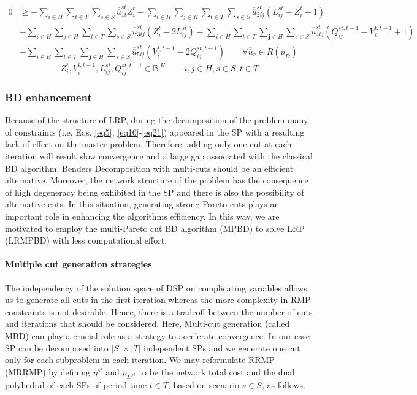 \documentclass[review]{elsarticle}
\begin{document}
\begin{align}
0&\geq -\sum_{i\in H}\sum_{t\in T}\sum_{s\in S}\overline{\overline{u}}^{st}_{1i}Z^t_i-\sum_{i\in H}{\sum_{j\in H}{\sum_{t\in T}{\sum_{s\in S}{{\overline{\overline{u}}}^{st}_{2ij}\left(L^{st}_{ij}-Z^t_i+1\right)}}}}\nonumber\\
&-\sum_{i\in H}\sum_{j\in H}\sum_{t\in T}\sum_{s\in S}{\overline{\overline{u}}}^{st}_{3ij}\left(Z^t_i-2L^{st}_{ij}\right)
-\sum_{i\in H}{\sum_{t\in T}{\sum_{\mathbf{ j}\in H}{\sum_{s\in S}{{\overline{\overline{u}}}^{st}_{4ij}\left(Q^{st,t-1}_{ij}-V^{t,t-1}_i+1\right)}}}}\nonumber\\
&-\sum_{i\in H}{\sum_{t\in T}{\sum_{\mathbf{ j}\in H}{\sum_{s\in S}{{\overline{\overline{u}}}^{st}_{5ij}\left(V^{t,t-1}_i-2Q^{st,t-1}_{ij}\right)}}}}\qquad\forall {\overline{\overline{u}}}_r\in R(p_D)
\end{align} 
\[Z^t_i,V^{t,t-1}_i,L^{st}_{ij},Q^{st,t-1}_{ij}\in {\mathbb{ B}}^{\left|H\right|}\qquad i,j\in H, s\in S, t\in T\]

\subsubsection{BD enhancement}

Because of the structure of LRP, during the decomposition of the problem many of constraints (i.e. Eqs, \eqref{eq5}, \eqref{eq16}-\eqref{eq21}) appeared in the SP with a resulting lack of effect on the master problem. Therefore, adding only one cut at each iteration will result slow convergence and a large gap associated with the classical BD algorithm. Benders Decomposition with multi-cuts should be an efficient alternative. Moreover, the network structure of the problem has the consequence of high degeneracy being exhibited in the SP and there is also the possibility of alternative cuts. In this situation, generating strong Pareto cuts plays an important role in enhancing the algorithms efficiency. In this way, we are motivated to employ the multi-Pareto cut BD algorithm (MPBD) to solve LRP (LRMPBD) with less computational effort.

\paragraph{Multiple cut generation strategies}

The independency of the solution space of DSP on complicating variables allows us to generate all cuts in the first iteration whereas the more complexity in RMP constraints is not desirable. Hence, there is a tradeoff between the number of cuts and iterations that should be considered. Here, Multi-cut generation (called MBD) can play a crucial role as a strategy to accelerate convergence. In our case SP can be decomposed into $|S|\times |T|$ independent SPs  and we generate one cut only for each subproblem in each iteration. We may reformulate RRMP (MRRMP) by defining $\eta^{st}$ and $p_{D^{st}}$ to be the network total cost and the dual polyhedral of each SPs of period time $t\in T$, based on scenario $s\in S$, as follows.
\end{document}
